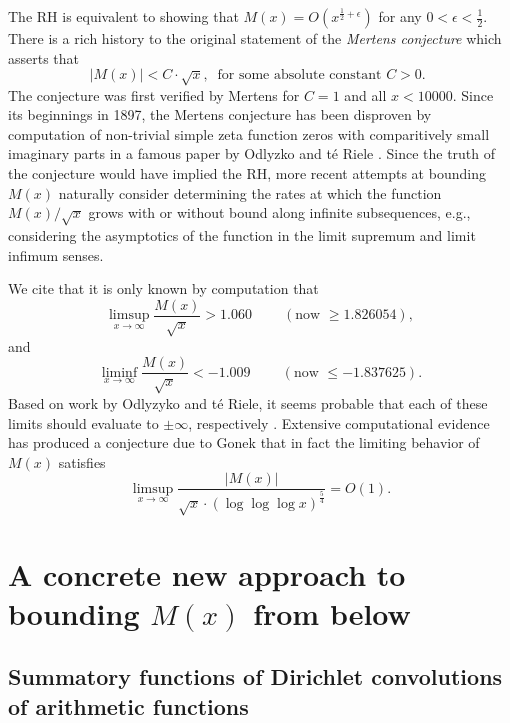 \documentclass[11pt,reqno,a4letter]{article}
\numberwithin{figure}{section}
\numberwithin{table}{section}
\newcommand{\cf}{\textit{cf.\ }}
\newcommand{\seqnum}[1]{\href{http://oeis.org/#1}{\color{ProcessBlue}{\underline{#1}}}}
\theoremstyle{plain}
\numberwithin{theorem}{section}
\theoremstyle{definition}
\begin{document}
The RH is equivalent to showing that 
$M(x) = O\left(x^{\frac{1}{2}+\epsilon}\right)$ for any 
$0 < \epsilon < \frac{1}{2}$. 
There is a rich history to the original statement of the \emph{Mertens conjecture} which 
asserts that 
\[ 
|M(x)| < C \cdot \sqrt{x},\ \text{ for some absolute constant $C > 0$. }
\] 
The conjecture was first verified by Mertens for $C = 1$ and all $x < 10000$. 
Since its beginnings in 1897, the Mertens conjecture has been disproven by computation 
of non-trivial simple zeta function zeros with comparitively small imaginary parts in a famous paper by 
Odlyzko and t\'{e} Riele \cite{ODLYZ-TRIELE}. 
Since the truth of the conjecture would have implied the RH, more recent attempts 
at bounding $M(x)$ naturally consider determining the rates at which the function 
$M(x) / \sqrt{x}$ grows with or without bound along infinite 
subsequences, e.g., considering the asymptotics of the function in the limit supremum and 
limit infimum senses. 

We cite that it is only known by computation 
that \cite[\cf \S 4.1]{PRIMEREC} 
\cite[\cf \seqnum{A051400}; \seqnum{A051401}]{OEIS} 
\[
\limsup_{x\rightarrow\infty} \frac{M(x)}{\sqrt{x}} > 1.060\ \qquad (\text{now } \geq 1.826054), 
\] 
and 
\[ 
\liminf_{x\rightarrow\infty} \frac{M(x)}{\sqrt{x}} < -1.009\ \qquad (\text{now } \leq -1.837625). 
\] 
Based on work by Odlyzyko and t\'{e} Riele, it seems probable that 
each of these limits should evaluate to $\pm \infty$, respectively 
\cite{ODLYZ-TRIELE,MREVISITED,ORDER-MERTENSFN,HURST-2017}. 
Extensive computational evidence has produced 
a conjecture due to Gonek that in fact the limiting behavior of 
$M(x)$ satisfies \cite{NG-MERTENS}
$$\limsup_{x \rightarrow \infty} \frac{|M(x)|}{\sqrt{x} \cdot (\log\log\log x)^{\frac{5}{4}}} = O(1).$$ 

\newpage 
\section{A concrete new approach to bounding $M(x)$ from below} 

\subsection{Summatory functions of Dirichlet convolutions of arithmetic functions} 
\end{document}
